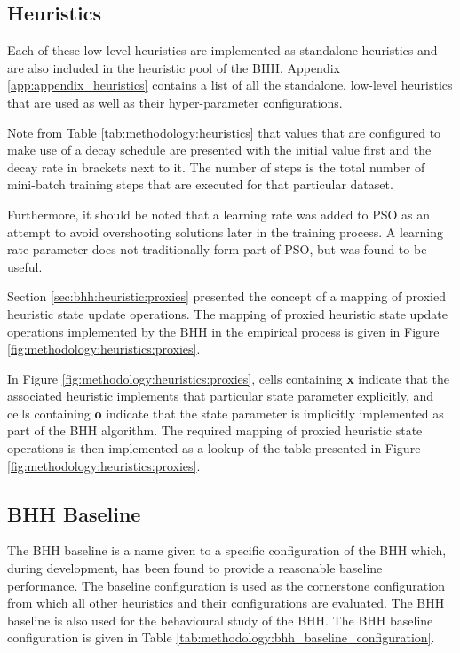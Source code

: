 \subsection{Heuristics}\label{sec:methodology:heuristics}

Each of these low-level heuristics are implemented as standalone heuristics and are also included in the heuristic pool of the \acs{BHH}. Appendix \ref{app:appendix_heuristics} contains a list of all the standalone, low-level heuristics that are used as well as their hyper-parameter configurations.

Note from Table \ref{tab:methodology:heuristics} that values that are configured to make use of a decay schedule are presented with the initial value first and the decay rate in brackets next to it. The number of steps is the total number of mini-batch training steps that are executed for that particular dataset.

Furthermore, it should be noted that a learning rate was added to \acs{PSO} as an attempt to avoid overshooting solutions later in the training process. A learning rate parameter does not traditionally form part of \acs{PSO}, but was found to be useful.

Section \ref{sec:bhh:heuristic:proxies} presented the concept of a mapping of proxied heuristic state update operations. The mapping of proxied heuristic state update operations implemented by the \acs{BHH} in the empirical process is given in Figure \ref{fig:methodology:heuristics:proxies}.

In Figure \ref{fig:methodology:heuristics:proxies}, cells containing \textbf{x} indicate that the associated heuristic implements that particular state parameter explicitly, and cells containing \textbf{o} indicate that the state parameter is implicitly implemented as part of the \acs{BHH} algorithm. The required mapping of proxied heuristic state operations is then implemented as a lookup of the table presented in Figure \ref{fig:methodology:heuristics:proxies}.

\subsection{BHH Baseline}\label{sec:methodology:baseline_bhh}

The \acs{BHH} baseline is a name given to a specific configuration of the \acs{BHH} which, during development, has been found to provide a reasonable baseline performance. The baseline configuration is used as the cornerstone configuration from which all other heuristics and their configurations are evaluated. The \acs{BHH} baseline is also used for the behavioural study of the \acs{BHH}. The \acs{BHH} baseline configuration is given in Table \ref{tab:methodology:bhh_baseline_configuration}.

